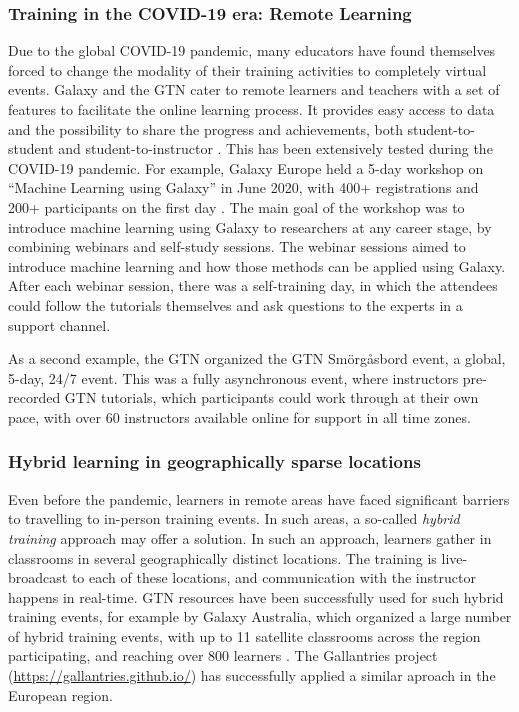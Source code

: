 \documentclass[10pt,letterpaper]{article}
\begin{document}
\subsubsection*{Training in the COVID-19 era: Remote Learning}
Due to the global COVID-19 pandemic, many educators have found themselves forced to change the modality of their training activities to completely virtual events.
Galaxy and the GTN cater to remote learners and teachers with a set of features to facilitate the online learning process. It provides easy access to data and the possibility to share the progress and achievements, both student-to-student and student-to-instructor \cite{SerranoSolano2020}. This has been extensively tested during the COVID-19 pandemic. For example, Galaxy Europe held a 5-day workshop on ``Machine Learning using Galaxy'' in June 2020, with 400+ registrations and 200+ participants on the first day \cite{FreiburgGalaxyTeam2020}. The main goal of the workshop was to introduce machine learning using Galaxy to researchers at any career stage, by combining webinars and self-study sessions. The webinar sessions aimed to introduce machine learning and how those methods can be applied using Galaxy. After each webinar session, there was a self-training day, in which the attendees could follow the tutorials themselves and ask questions to the experts in a support channel.

As a second example, the GTN organized the GTN Smörgåsbord event, a global, 5-day, 24/7 event. This was a fully asynchronous event, where instructors pre-recorded GTN tutorials, which participants could work through at their own pace, with over 60 instructors available online for support in all time zones.

\subsubsection*{Hybrid learning in geographically sparse locations} 
Even before the pandemic, learners in remote areas have faced significant barriers to travelling to in-person training events. In such areas, a so-called \emph{hybrid training} approach may offer a solution. In such an approach, learners gather in classrooms in several geographically distinct locations. The training is live-broadcast to each of these locations, and communication with the instructor happens in real-time. 
GTN resources have been successfully used for such hybrid training events, for example by Galaxy Australia, which organized a large number of hybrid training events, with up to 11 satellite classrooms across the region participating, and reaching over 800 learners \cite{Hall2021}. The Gallantries project (\url{https://gallantries.github.io/}) has successfully applied a similar aproach in the European region.
\end{document}
